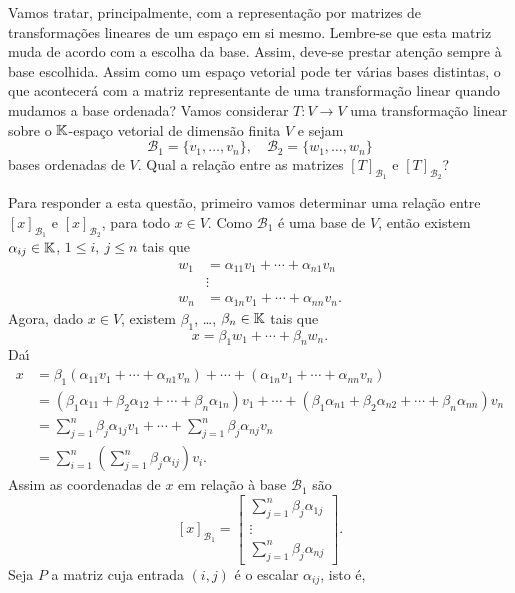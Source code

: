 Vamos tratar, principalmente, com a representa\c{c}\~ao por matrizes de transforma\c{c}\~oes lineares de um espa\c{c}o em si mesmo. Lembre-se que esta matriz muda de acordo com a escolha da base. Assim, deve-se prestar aten\c{c}\~ao sempre \`a base escolhida. Assim como um espa\c{c}o vetorial pode ter v\'arias bases distintas, o que acontecer\'a com a matriz representante de uma transforma\c{c}\~ao linear quando mudamos a base ordenada? Vamos considerar $T : V \to V$ uma transforma\c{c}\~ao linear sobre o $\mathbb{K}$-espa\c{c}o vetorial de dimens\~ao finita $V$ e sejam
\[
	\mathcal{B}_1 = \{v_1,\dots,v_n\}, \quad \mathcal{B}_2 = \{w_1,\dots,w_n\}
\]
bases ordenadas de $V$. Qual a rela\c{c}\~ao entre as matrizes $[T]_{\mathcal{B}_1}$ e $[T]_{\mathcal{B}_2}$?

Para responder a esta quest\~ao, primeiro vamos determinar uma rela\c{c}\~ao entre $[x]_{\mathcal{B}_1}$ e $[x]_{\mathcal{B}_2}$, para todo $x \in V$. Como $\mathcal{B}_1$ \'e uma base de $V$, ent\~ao existem $\alpha_{ij} \in \mathbb{K}$, $1 \le i,\ j \le n$ tais que
\begin{align*}
	w_1 &= \alpha_{11}v_1 + \cdots + \alpha_{n1}v_n\\
	&\vdots\\
	w_n &= \alpha_{1n}v_1 + \cdots + \alpha_{nn}v_n.
\end{align*}
Agora, dado $x \in V$, existem $\beta_1$, \dots, $\beta_n \in \mathbb{K}$ tais que
\[
	x = \beta_1w_1 + \cdots + \beta_nw_n.
\]
Da{\'\i}
\begin{align*}
	x &= \beta_1(\alpha_{11}v_1 + \cdots + \alpha_{n1}v_n) + \cdots + (\alpha_{1n}v_1 + \cdots + \alpha_{nn}v_n)\\
	&= (\beta_1\alpha_{11} + \beta_2\alpha_{12} + \cdots + \beta_n\alpha_{1n})v_1 + \cdots + (\beta_1\alpha_{n1} + \beta_2\alpha_{n2} + \cdots + \beta_n\alpha_{nn})v_n\\
	&= \sum_{j=1}^n\beta_j\alpha_{1j}v_1 + \cdots + \sum_{j=1}^n\beta_j\alpha_{nj}v_n\\
	&= \sum_{i=1}^n\left(\sum_{j=1}^n\beta_j\alpha_{ij}\right)v_i.
\end{align*}
Assim as coordenadas de $x$ em rela\c{c}\~ao \`a base $\mathcal{B}_1$ s\~ao
\[
	[x]_{\mathcal{B}_1} = \begin{bmatrix}
		\sum_{j=1}^n\beta_j\alpha_{1j}\\
		\vdots\\
		\sum_{j=1}^n\beta_j\alpha_{nj}
	\end{bmatrix}.
\]
Seja $P$ a matriz cuja entrada $(i,j)$ \'e o escalar $\alpha_{ij}$, isto \'e,
